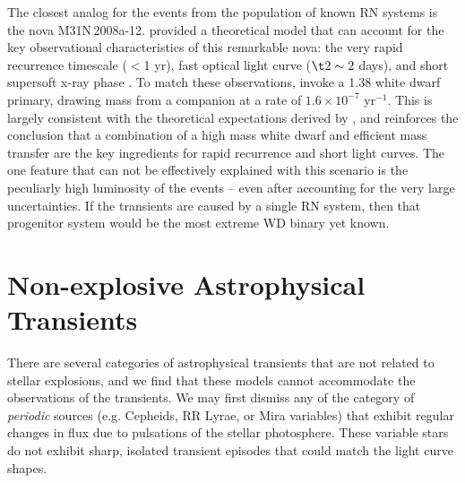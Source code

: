 The closest analog for the \spock events from the population of known
RN systems is the nova M31N\,2008a-12.  \citet{Kato:2015} provided a
theoretical model that can account for the key observational
characteristics of this remarkable nova: the very rapid recurrence
timescale ($<$1 yr), fast optical light curve ($\t2\sim2$ days), and
short supersoft x-ray phase \citep[6-18 days after optical
  outburst][]{Henze:2015a}.  To match these observations,
\citeauthor{Kato:2015} invoke a 1.38 \Msun white dwarf primary,
drawing mass from a companion at a rate of $1.6\times10^{-7}$ \Msun
yr$^{-1}$.  This is largely consistent with the theoretical
expectations derived by \citet{Yaron:2005}, and reinforces the
conclusion that a combination of a high mass white dwarf and efficient
mass transfer are the key ingredients for rapid recurrence and short
light curves. The one feature that can not be effectively explained
with this scenario is the peculiarly high luminosity of the \spock
events -- even after accounting for the very large uncertainties.  If
the \spock transients are caused by a single RN system, then that
progenitor system would be the most extreme WD binary yet known.



\section{Non-explosive Astrophysical Transients}

There are several categories of astrophysical transients that are not
related to stellar explosions, and we find that these models cannot
accommodate the observations of the \spock transients.  We may first
dismiss any of the category of {\it periodic} sources (e.g. Cepheids,
RR Lyrae, or Mira variables) that exhibit regular changes in flux due
to pulsations of the stellar photosphere. These variable stars do not
exhibit sharp, isolated transient episodes that could match the \spock
light curve shapes.

